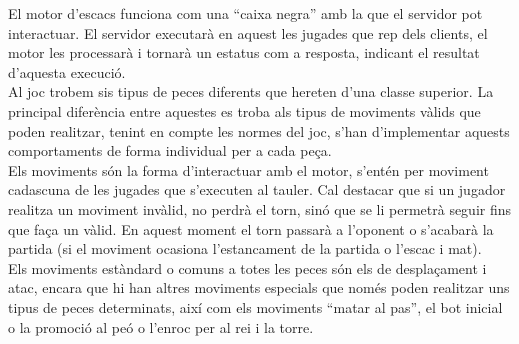 El motor d’escacs funciona com una “caixa negra” amb la que el servidor pot interactuar. El servidor executarà en aquest les jugades que rep dels clients, el motor les processarà i tornarà un estatus com a resposta, indicant el resultat d'aquesta execució.
\\[3mm]
Al joc trobem sis tipus de peces diferents que hereten d’una classe superior. La principal diferència entre aquestes es troba als tipus de moviments vàlids que poden realitzar, tenint en compte les normes del joc, s’han d’implementar aquests comportaments de forma individual per a cada peça.
\\[3mm]
Els moviments són la forma d’interactuar amb el motor, s'entén per moviment cadascuna de les jugades que s'executen al tauler.
Cal destacar que si un jugador realitza un moviment invàlid, no perdrà el torn, sinó que se li permetrà seguir fins que faça un vàlid. En aquest moment el torn passarà a l'oponent o s’acabarà la partida (si el moviment ocasiona l’estancament de la partida o l’escac i mat).
\\[3mm]
Els moviments estàndard o comuns a totes les peces són els de desplaçament i atac, encara que hi han altres moviments especials que només poden realitzar uns tipus de peces determinats, així com els moviments “matar al pas”, el bot inicial o la promoció al peó o l’enroc per al rei i la torre.
